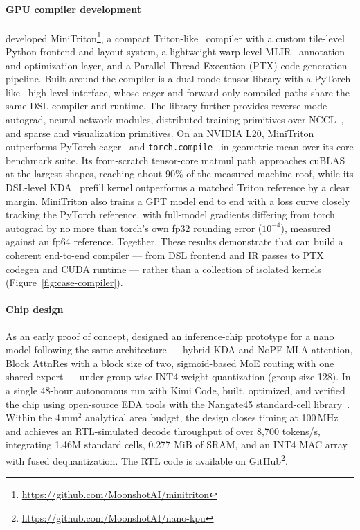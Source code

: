 \paragraph{GPU compiler development}  developed MiniTriton\footnote{\url{https://github.com/MoonshotAI/minitriton}}, a compact Triton-like~\citep{tillet2019triton} compiler with a custom tile-level Python frontend and layout system, a lightweight warp-level MLIR~\citep{lattner2021mlir} annotation and optimization layer, and a Parallel Thread Execution (PTX) code-generation pipeline. Built around the compiler is a dual-mode tensor library with a PyTorch-like~\citep{paszke2019pytorch} high-level interface, whose eager and forward-only compiled paths share the same DSL compiler and runtime. The library further provides reverse-mode autograd, neural-network modules, distributed-training primitives over NCCL~\citep{nccl},  and sparse and visualization primitives.
On an NVIDIA L20, MiniTriton outperforms PyTorch eager~\citep{paszke2019pytorch} and \texttt{torch.compile}~\citep{ansel2024pytorch2} in geometric mean over its core benchmark suite. Its from-scratch tensor-core matmul path approaches cuBLAS~\citep{cublas} at the largest shapes,  reaching about 90\% of the measured machine roof, while its DSL-level KDA~\citep{team2025kimi} prefill kernel outperforms a matched Triton reference by a clear margin. MiniTriton also trains a GPT model end to end with a loss curve closely tracking the PyTorch reference, with full-model gradients differing from torch autograd by no more than torch's own fp32 rounding error ($10^{-4}$), measured against an fp64 reference. Together, These results demonstrate that  can build a coherent end-to-end compiler --- from DSL frontend and IR passes to PTX codegen and CUDA runtime --- rather than a collection of isolated kernels (Figure~\ref{fig:case-compiler}).


\paragraph{Chip design} 
As an early proof of concept,  designed an inference-chip prototype for a nano model following the same architecture --- hybrid KDA and NoPE-MLA attention, Block AttnRes with a block size of two, sigmoid-based MoE routing with one shared expert --- under
group-wise INT4 weight quantization (group size 128). In a single 48-hour autonomous run with Kimi Code,  built, optimized, and verified the chip using open-source EDA tools with the Nangate45 standard-cell library~\cite{nangate45}. Within the 4\,mm$^2$ analytical area budget, the design closes timing at 100\,MHz and achieves an RTL-simulated decode throughput of over 8{,}700 tokens/s, integrating 1.46M standard cells, 0.277 MiB of SRAM, and an INT4 MAC array with fused dequantization. 
The RTL code is available on GitHub\footnote{\url{https://github.com/MoonshotAI/nano-kpu}}.



